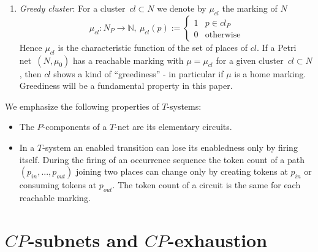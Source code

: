 \documentclass{fundam}
\begin{document}
\begin{remark}
\begin{enumerate}
Each well-formed free-choice net is covered by $P$-components. The token count of  a $P$-compon\-ent  is the same for all reachable markings of $(N,\mu_0)$. Each strongly connected $P$-subnet of a well-formed free-choice net, in particular each elementary circuit, is contained in a $P$-component, \cite[Chap. 5]{TV1984}.

\item \emph{Greedy cluster}: For a \mbox{cluster $cl \subset N$} we denote by $\mu_{cl}$ the marking of $N$
$$\mu_{cl}:N_P \xrightarrow{} \mathbb{N},\ \mu_{cl}(p):=\begin{cases}
1 & p \in cl_P \\
0 & \text{otherwise}
\end{cases}$$
Hence $\mu_{cl}$ is the characteristic function of the set of places of $cl$. If a Petri \mbox{net $(N,\mu_0)$} has a reachable marking with $\mu=\mu_{cl}$ for a given \mbox{cluster $cl \subset N$}, then $cl$ shows a kind of ``greediness'' - in particular if $\mu$ is a home marking. Greediness will be a fundamental property in this paper.
\end{enumerate}
\end{remark}

\begin{flushleft}
We emphasize the following properties of $T$-systems:
\end{flushleft}
\begin{remark}\label{rem_enablingtsystem}
\begin{itemize}
\item The $P$-components of a $T$-net are its elementary circuits.

\item In a $T$-system an enabled transition can lose its enabledness only by firing itself. During the firing of an occurrence sequence the token count of a path
$(p_{in},...,p_{out})$ joining two places can change only by creating tokens at $p_{in}$ or consuming tokens at $p_{out}$. The token count of a circuit is the same for each reachable marking.
\end{itemize}
\end{remark}

\section{$CP$-subnets and $CP$-exhaustion}\label{sect_cpexhaustion}
\end{document}
